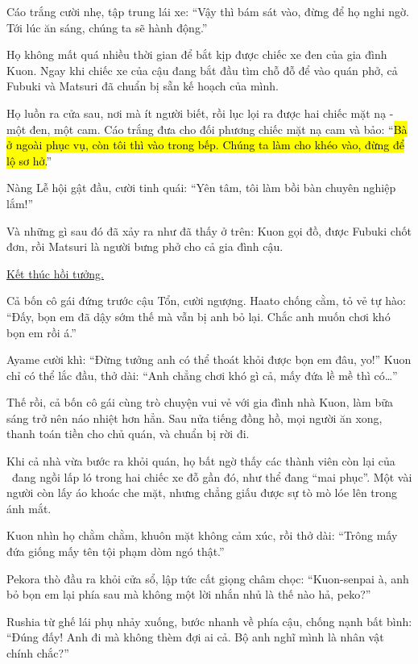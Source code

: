 \documentclass[../main.tex]{subfiles}
\begin{document}
Cáo trắng cười nhẹ, tập trung lái xe: ``Vậy thì bám sát vào, đừng để họ nghi ngờ. Tới lúc ăn sáng, chúng ta sẽ hành động.''

Họ không mất quá nhiều thời gian để bắt kịp được chiếc xe đen của gia đình Kuon. Ngay khi chiếc xe của cậu đang bắt đầu tìm chỗ đỗ để vào quán phở, cả Fubuki và Matsuri đã chuẩn bị sẵn kế hoạch của mình.

Họ luồn ra cửa sau, nơi mà ít người biết, rồi lục lọi ra được hai chiếc mặt nạ - một đen, một cam. Cáo trắng đưa cho đối phương chiếc mặt nạ cam và bảo: ``\hl{Bà ở ngoài phục vụ, còn tôi thì vào trong bếp. Chúng ta làm cho khéo vào, đừng để lộ sơ hở.}''

Nàng Lễ hội gật đầu, cười tinh quái: ``Yên tâm, tôi làm bồi bàn chuyên nghiệp lắm!''

Và những gì sau đó đã xảy ra như đã thấy ở trên: Kuon gọi đồ, được Fubuki chốt đơn, rồi Matsuri là người bưng phở cho cả gia đình cậu.

\begin{center}
    \uline{Kết thúc hồi tưởng.}
\end{center}

Cả bốn cô gái đứng trước cậu Tổn, cười ngượng. Haato chống cằm, tỏ vẻ tự hào: ``Đấy, bọn em đã dậy sớm thế mà vẫn bị anh bỏ lại. Chắc anh muốn chơi khó bọn em rồi á.''

Ayame cười khì: ``Đừng tưởng anh có thể thoát khỏi được bọn em đâu, yo!'' Kuon chỉ có thể lắc đầu, thở dài: ``Anh chẳng chơi khó gì cả, mấy đứa lề mề thì có\dots''

Thế rồi, cả bốn cô gái cùng trò chuyện vui vẻ với gia đình nhà Kuon, làm bữa sáng trở nên náo nhiệt hơn hẳn. Sau nửa tiếng đồng hồ, mọi người ăn xong, thanh toán tiền cho chủ quán, và chuẩn bị rời đi.

\ct

Khi cả nhà vừa bước ra khỏi quán, họ bất ngờ thấy các thành viên còn lại của \hll\ đang ngồi lấp ló trong hai chiếc xe đỗ gần đó, như thể đang ``mai phục''. Một vài người còn lấy áo khoác che mặt, nhưng chẳng giấu được sự tò mò lóe lên trong ánh mắt.

Kuon nhìn họ chằm chằm, khuôn mặt không cảm xúc, rồi thở dài: ``Trông mấy đứa giống mấy tên tội phạm dòm ngó thật.''

Pekora thò đầu ra khỏi cửa sổ, lập tức cất giọng châm chọc: ``Kuon-senpai à, anh bỏ bọn em lại phía sau mà không một lời nhắn nhủ là thế nào hả, peko?''

Rushia từ ghế lái phụ nhảy xuống, bước nhanh về phía cậu, chống nạnh bất bình: ``Đúng đấy! Anh đi mà không thèm đợi ai cả. Bộ anh nghĩ mình là nhân vật chính chắc?''
\end{document}
